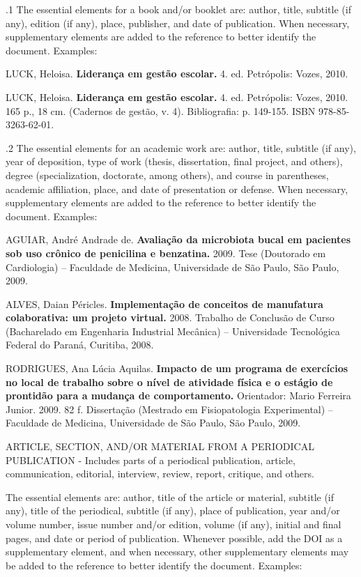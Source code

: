 \documentclass[revista,english,oneside]{ifes8}
\begin{document}
\vspace{2mm}
.1 The essential elements for a book and/or booklet are: author, title,
subtitle (if any), edition (if any), place, publisher, and date of publication. When
necessary, supplementary elements are added to the reference to better identify the
document. Examples:

LUCK, Heloisa. \textbf{Liderança em gestão escolar.} 4. ed. Petrópolis: Vozes, 2010.

LUCK, Heloisa. \textbf{Liderança em gestão escolar.} 4. ed. Petrópolis: Vozes, 2010. 165
p., 18 cm. (Cadernos de gestão, v. 4). Bibliografia: p. 149-155. ISBN 978-85-3263-62-01.

\vspace{2mm}
.2 The essential elements for an academic work are: author, title, subtitle
(if any), year of deposition, type of work (thesis, dissertation, final project, and
others), degree (specialization, doctorate, among others), and course in parentheses,
academic affiliation, place, and date of presentation or defense. When necessary,
supplementary elements are added to the reference to better identify the document.
Examples:

AGUIAR, André Andrade de. \textbf{Avaliação da microbiota bucal em pacientes sob uso
crônico de penicilina e benzatina.} 2009. Tese (Doutorado em Cardiologia) -- Faculdade
de Medicina, Universidade de São Paulo, São Paulo, 2009.

ALVES, Daian Péricles. \textbf{Implementação de conceitos de manufatura colaborativa: um
projeto virtual.} 2008. Trabalho de Conclusão de Curso (Bacharelado em Engenharia
Industrial Mecânica) -- Universidade Tecnológica Federal do Paraná, Curitiba, 2008.

RODRIGUES, Ana Lúcia Aquilas. \textbf{Impacto de um programa de exercícios no local de
trabalho sobre o nível de atividade física e o estágio de prontidão para a mudança de
comportamento.} Orientador: Mario Ferreira Junior. 2009. 82 f. Dissertação (Mestrado em
Fisiopatologia Experimental) -- Faculdade de Medicina, Universidade de São Paulo, São
Paulo, 2009.

\vspace{4mm}
 ARTICLE, SECTION, AND/OR MATERIAL FROM A PERIODICAL PUBLICATION - Includes
parts of a periodical publication, article, communication, editorial, interview, review,
report, critique, and others.

\vspace{2mm}
\noindent The essential elements are: author, title of the article or material, subtitle
(if any), title of the periodical, subtitle (if any), place of publication, year and/or
volume number, issue number and/or edition, volume (if any), initial and final pages,
and date or period of publication. Whenever possible, add the
DOI as a supplementary element, and when necessary, other supplementary elements may be
added to the reference to better identify the document. Examples:
\end{document}
